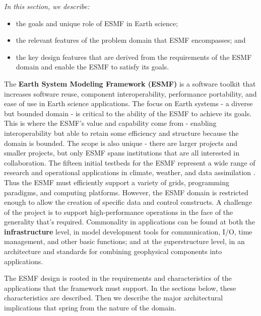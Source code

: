 
{\it 
In this section, we describe: 
\begin{itemize}
\item the goals and unique role of ESMF in Earth science;
\item the relevant features of the problem domain that ESMF encompasses; and
\item the key design features that are derived from the requirements of the ESMF domain and 
enable the ESMF to satisfy its goals. 
\end{itemize}
}

The {\bf Earth System Modeling Framework (ESMF)} is a software toolkit that increases 
software reuse, component interoperability, performance portability, and ease of use in 
Earth science applications.  The focus on Earth systems - a diverse but bounded domain - is 
critical to the ability of the ESMF to achieve its goals.  This is where the ESMF's value and 
capability come from - enabling interoperability but able to retain some efficiency and structure 
because the domain is bounded.  The scope is also unique - there are larger projects and smaller 
projects, but only ESMF spans institutions that are all interested in collaboration. The fifteen 
initial testbeds for the ESMF represent a wide range of research and operational applications in 
climate, weather, and data assimilation \cite{ref:models}.  Thus the ESMF must efficiently 
support a variety of grids, programming paradigms, and computing platforms.  However, the ESMF 
domain is restricted enough to allow the creation of specific data and control constructs.  A 
challenge of the project is to support high-performance operations in the face of the generality 
that's required.  Commonality in applications can be found at both the {\bf infrastructure} 
level, in model development tools for communication, I/O, time management, and other basic 
functions; and at the {\b superstructure} level, in an architecture and standards for 
combining geophysical components into applications.

The ESMF design is rooted in the requirements and characteristics of the applications that 
the framework must support.  In the sections below, these characteristics are described.  
Then we describe the major architectural implications that spring from the nature of the 
domain.


